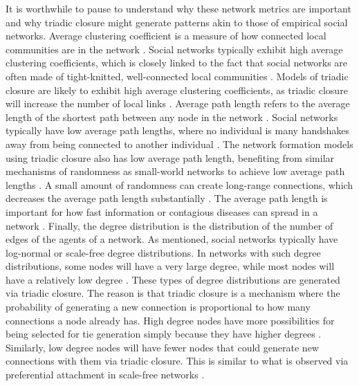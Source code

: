 \documentclass[11pt]{article}
\begin{document}
\noindent It is worthwhile to pause to understand why these network metrics are important and why triadic closure might generate patterns akin to those of empirical social networks. Average clustering coefficient is a measure of how connected local communities are in the network \cite{watts_collective_1998}. Social networks typically exhibit high average clustering coefficients, which is closely linked to the fact that social networks are often made of tight-knitted, well-connected local communities \cite{peixoto_disentangling_2022}. Models of triadic closure are likely to exhibit high average clustering coefficients, as triadic closure will increase the number of local links \cite{jackson_meeting_2007}. 
Average path length refers to the average length of the shortest path between any node in the network \cite{watts_collective_1998}. Social networks typically have low average path lengths, where no individual is many handshakes away from being connected to another individual \cite{backstrom2012four}. The network formation models using triadic closure also has low average path length, benefiting from similar mechanisms of randomness as small-world networks to achieve low average path lengths \cite{jackson_meeting_2007,watts_collective_1998}. A small amount of randomness can create long-range connections, which decreases the average path length substantially \cite{watts_networks_1999}. The average path length is important for how fast information or contagious diseases can spread in a network \cite{cowan2004network}. 
Finally, the degree distribution is the distribution of the number of edges of the agents of a network. As mentioned, social networks typically have log-normal or scale-free degree distributions. In networks with such degree distributions, some nodes will have a very large degree, while most nodes will have a relatively low degree \cite{bianconi_triadic_2014}. These types of degree distributions are generated via triadic closure. The reason is that triadic closure is a mechanism where the probability of generating a new connection is proportional to how many connections a node already has. High degree nodes have more possibilities for being selected for tie generation simply because they have higher degrees \cite{jackson_meeting_2007}. Similarly, low degree nodes will have fewer nodes that could generate new connections with them via triadic closure. This is similar to what is observed via preferential attachment in scale-free networks \cite{barabasi_scale-free_2003}.
\end{document}
